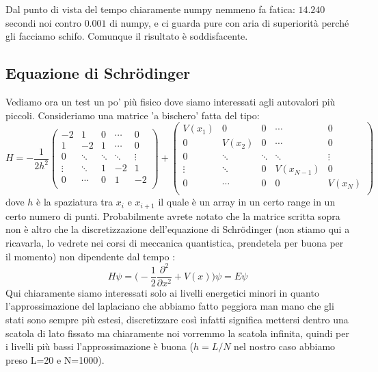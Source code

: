 \documentclass[10pt,a4paper]{article}
\begin{document}
Dal punto di vista del tempo chiaramente numpy nemmeno fa fatica: $14.240$ secondi noi contro $0.001$ di numpy, e ci guarda pure con aria di superiorità perché gli facciamo schifo. Comunque il risultato è soddisfacente.\\

\subsection{Equazione di Schrödinger}
Vediamo ora un test un po' più fisico dove siamo interessati agli autovalori più piccoli. Consideriamo una matrice 'a bischero' fatta del tipo:
\begin{equation}
H = - \frac{1}{2h^2}
\begin{pmatrix}
-2 & 1  & 0 & \cdots &0\\
1  & -2 & 1 & \cdots &0\\
0 & \ddots & \ddots & \ddots &\vdots \\
\vdots & \ddots & 1 &  -2 & 1 \\
0 & \cdots &0&  1 & -2 \\
\end{pmatrix}
+
\begin{pmatrix}
V(x_1) & 0  & 0 & \cdots &0\\
0  & V(x_2) & 0 & \cdots &0\\
0 & \ddots & \ddots & \ddots &\vdots \\
\vdots & \ddots & 0 &  V(x_{N-1}) & 0 \\
0 & \cdots &0&  0 & V(x_N) \\
\end{pmatrix}
\end{equation}
dove $h$ è la spaziatura tra $x_i$ e $x_{i+1}$ il quale è un array in un certo range in un certo numero di punti. Probabilmente avrete notato che la matrice scritta sopra non è altro che la discretizzazione dell'equazione di Schrödinger (non stiamo qui a ricavarla, lo vedrete nei corsi di meccanica quantistica, prendetela per buona per il momento) non dipendente dal tempo :
\begin{equation}
H \psi = \bigg( - \frac{1}{2}\frac{\partial^2}{\partial x^2} + V(x) \bigg) \psi = E \psi
\end{equation}
Qui chiaramente siamo interessati solo ai livelli energetici minori in quanto l'approssimazione del laplaciano che abbiamo fatto peggiora man mano che gli stati sono sempre più estesi, discretizzare così infatti significa mettersi dentro una scatola di lato fissato ma chiaramente noi vorremmo la scatola infinita, quindi per i livelli più bassi l'approssimazione è buona ($h = L/N$ nel nostro caso abbiamo preso L=20 e N=1000).
\end{document}
